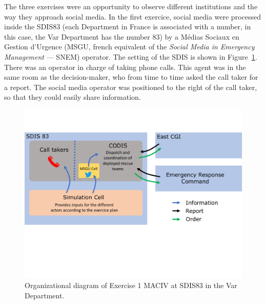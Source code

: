 The three exercises were an opportunity to observe different institutions and the way they approach social media.
In the first exercice, social media were processed inside the SDIS83 (each Department in
France is associated with a number, in this case, the Var Department has the number 83)
by a Médias Sociaux en Gestion d’Urgence (MSGU, french equivalent of the \textit{Social Media in Emergency Management} — SNEM) operator.
The setting of the SDIS is shown in Figure~\ref{information:sdis83}.
There was an operator in charge of taking phone calls.
This agent was in the same room as the decision-maker, who from time to time asked the call taker for a report.
The social media operator was positioned to the right of the call taker, so that they could easily share information.

\begin{figure}[htb]
    \centering
    \includegraphics[width=\textwidth]{figures/chap-3/SDIS83.pdf}
    \caption{Organizational diagram of Exercise 1 MACIV at SDIS83 in the Var Department.}
    \label{information:sdis83}
\end{figure}

